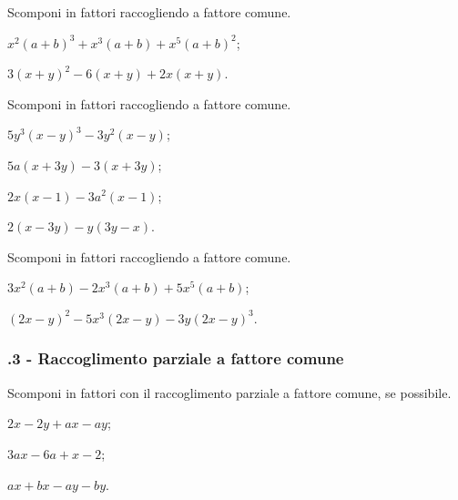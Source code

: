 \begin{esercizio}[\Ast]
Scomponi in fattori raccogliendo a fattore comune.
\label{ese:15.14}
 \begin{multicols}{2}
 \begin{enumeratea}
 \item $x^{2}(a+b)^{3}+x^{3}(a+b)+x^{5}(a+b)^{2}$;
 \item $3(x+y)^{2}-6(x+y)+2x(x+y)$.
\end{enumeratea}
 \end{multicols}
\end{esercizio}

\begin{esercizio}
\label{ese:15.15}
Scomponi in fattori raccogliendo a fattore comune.
\begin{multicols}{2}
\begin{enumeratea}
 \item $5y^{3}(x-y)^{3}-3y^{2}(x-y)$;
 \item $5a(x+3y)-3(x+3y)$;
 \item $2x(x-1)-3a^{2}(x-1)$;
 \item $2(x-3y)-y(3y-x)$.
\end{enumeratea}
\end{multicols}
\end{esercizio}

\begin{esercizio}[\Ast]
Scomponi in fattori raccogliendo a fattore comune.
\label{ese:15.16}
\begin{multicols}{2}
 \begin{enumeratea}
 \item $3x^{2}(a+b)-2x^{3}(a+b)+5x^{5}(a+b)$;
 \item $(2x-y)^{2}-5x^{3}(2x-y)-3y(2x-y)^{3}$.
\end{enumeratea}
\end{multicols}
\end{esercizio}
\subsubsection*{\thechapter.3 - Raccoglimento parziale a fattore comune}

\begin{esercizio}[\Ast]
\label{ese:15.17}
Scomponi in fattori con il raccoglimento parziale a fattore comune, se possibile.
\begin{multicols}{3}
 \begin{enumeratea}
 \item $2x-2y+ax-ay$;
 \item $3ax-6a+x-2$;
 \item $ax+bx-ay-by$.
\end{enumeratea}
\end{multicols}
\end{esercizio}

